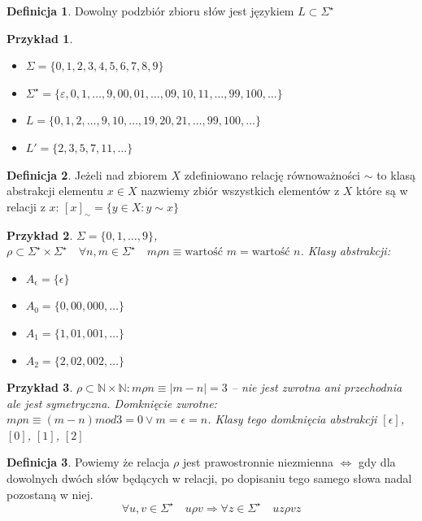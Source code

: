 \documentclass[12pt,a4paper]{article}
\newtheorem{przyklad}{Przykład}
\theoremstyle{definition}
\newtheorem{df}{Definicja}
\theoremstyle{remark}
\begin{document}
	\begin{df}
		Dowolny podzbiór zbioru słów jest językiem $L \subset \Sigma^\star$
	\end{df}

	\begin{przyklad}~\\
		\begin{itemize}
			\item $\Sigma = \{0, 1, 2, 3, 4, 5, 6, 7, 8, 9\}$
			\item $\Sigma^\star = \{\varepsilon, 0, 1, \dots, 9, 00, 01, \dots, 09, 10, 11, \dots, 99, 100, \dots\}$
			\item $L = \{0, 1, 2, \dots, 9, 10, \dots, 19, 20, 21, \dots, 99, 100, \dots \}$
			\item $L' = \{2, 3, 5, 7, 11, \dots \}$
		\end{itemize}
	\end{przyklad}

	\begin{df}
		Jeżeli nad zbiorem $X$ zdefiniowano relację równoważności $\sim$ to klasą abstrakcji elementu $x\in X$ nazwiemy zbiór wszystkich elementów 
		z $X$ które są w relacji z $x$: $[x]_\sim = \{y\in X: y\sim x\}$
	\end{df}		
	
	\begin{przyklad}
		$\Sigma = \{0, 1, \dots, 9\}$, $\rho \subset \Sigma^\star \times \Sigma^\star \quad \forall n,m\in \Sigma^\star \quad m\rho n \equiv
		 \text{wartość } m = \text{wartość } n$. Klasy abstrakcji: \\
		\begin{itemize}
			\item $A_\epsilon = \{\epsilon\}$
			\item $A_0 = \{0, 00, 000, \dots\}$
			\item $A_1 = \{1, 01, 001, \dots\}$
			\item $A_2 = \{2, 02, 002, \dots\}$
		\end{itemize}
	\end{przyklad}		
	
	\begin{przyklad}
		$\rho \subset \mathbb{N} \times \mathbb{N}:  m\rho n \equiv |m-n| = 3$ -- nie jest zwrotna ani przechodnia ale jest symetryczna.
		Domknięcie zwrotne: $m\rho n \equiv (m-n) mod 3 = 0 \vee m = \epsilon = n$. Klasy tego domknięcia abstrakcji $[\epsilon]$, $[0]$, $[1]$, $[2]$
	\end{przyklad}
	
	\begin{df}
		Powiemy że relacja $\rho$ jest prawostronnie niezmienna $\Leftrightarrow$ gdy dla dowolnych dwóch słów będących w relacji, po dopisaniu
		tego samego słowa nadal pozostaną w niej. 
		$$ \forall u, v \in \Sigma^\star \quad u\rho v \Rightarrow \forall z\in\Sigma^\star \quad uz \rho vz $$
	\end{df}
	
\end{document}

